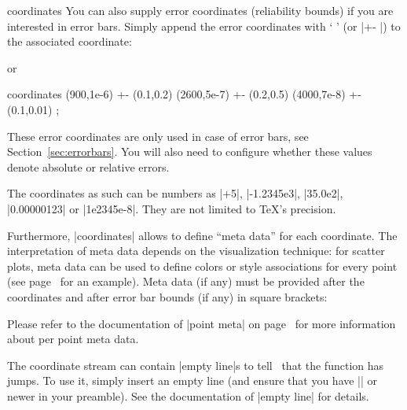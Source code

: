 {\begin{addplotoperation}[]{coordinates}{}
You can also supply error coordinates (reliability bounds) if you are interested in error bars. Simply append the error coordinates with `\declareandlabel{+-} ' (or |+- |) to the associated coordinate:
\begin{codeexample}[]
\end{codeexample}
or 
\begin{codeexample}
\addplot coordinates {
	 (900,1e-6) +- (0.1,0.2)
	(2600,5e-7) +- (0.2,0.5)
	(4000,7e-8) +- (0.1,0.01)
};
\end{codeexample}
These error coordinates are only used in case of error bars, see Section~\ref{sec:errorbars}. You will also need to configure whether these values denote absolute or relative errors.

The coordinates as such can be numbers as |+5|, |-1.2345e3|, |35.0e2|, |0.00000123| or |1e2345e-8|. They are not limited to \TeX's precision.

Furthermore, |coordinates| allows to define ``meta data'' for each coordinate. The interpretation of meta data depends on the visualization technique: for scatter plots, meta data can be used to define colors or style associations for every point (see page~\pageref{pgfplots:scatterclasses} for an example). Meta data (if any) must be provided after the coordinates and after error bar bounds (if any) in square brackets:
\begin{codeexample}[]
\end{codeexample}
Please refer to the documentation of |point meta| on page~\pageref{pgfplots:point:meta} for more information about per point meta data.

	The coordinate stream can contain |empty line|s to tell \PGFPlots\ that the function has jumps. To use it, simply insert an empty line (and ensure that you have |\pgfplotsset{compat=1.4}| or newer in your preamble). See the documentation of |empty line| for details.
\end{addplotoperation}

}
